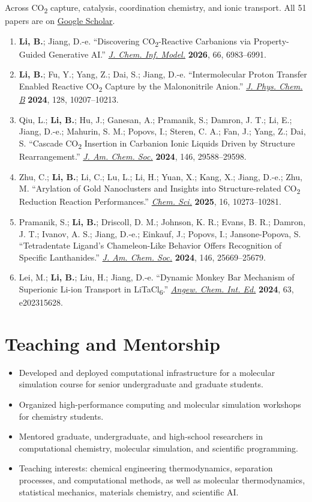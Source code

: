 \documentclass[10pt]{article}
\newcommand{\doi}[2]{\href{https://doi.org/#1}{\emph{#2}}}
\newcommand{\pub}[1]{\item #1}
\newcommand{\me}{\textbf{Li, B.}}
\newcommand{\co}{CO\textsubscript{2}}
\begin{document}
{\color{muted}Across \co{} capture, catalysis, coordination chemistry, and ionic transport. All 51
papers are on \href{https://scholar.google.com/citations?user=g8bfBFUAAAAJ}{Google Scholar}.}
\begin{enumerate}[leftmargin=1.6em, topsep=3pt, itemsep=2pt, parsep=0pt]
  \pub{\me; Jiang, D.-e. ``Discovering \co-Reactive Carbanions via Property-Guided Generative
    AI.'' \doi{10.1021/acs.jcim.6c00680}{J. Chem. Inf. Model.} \textbf{2026}, 66, 6983--6991.}
  \pub{\me; Fu, Y.; Yang, Z.; Dai, S.; Jiang, D.-e. ``Intermolecular Proton Transfer Enabled
    Reactive \co{} Capture by the Malononitrile Anion.'' \doi{10.1021/acs.jpcb.4c04482}{J. Phys. Chem. B} \textbf{2024},
    128, 10207--10213.}
  \pub{Qiu, L.; \me; Hu, J.; Ganesan, A.; Pramanik, S.; Damron, J. T.; Li, E.; Jiang, D.-e.;
    Mahurin, S. M.; Popovs, I.; Steren, C. A.; Fan, J.; Yang, Z.; Dai, S. ``Cascade \co{}
    Insertion in Carbanion Ionic Liquids Driven by Structure Rearrangement.'' \doi{10.1021/jacs.4c09933}{J. Am. Chem.
    Soc.} \textbf{2024}, 146, 29588--29598.}
  \pub{Zhu, C.; \me; Li, C.; Lu, L.; Li, H.; Yuan, X.; Kang, X.; Jiang, D.-e.; Zhu, M.
    ``Arylation of Gold Nanoclusters and Insights into Structure-related \co{} Reduction Reaction
    Performances.'' \doi{10.1039/d5sc01200g}{Chem. Sci.} \textbf{2025}, 16, 10273--10281.}
  \pub{Pramanik, S.; \me; Driscoll, D. M.; Johnson, K. R.; Evans, B. R.; Damron, J. T.; Ivanov,
    A. S.; Jiang, D.-e.; Einkauf, J.; Popovs, I.; Jansone-Popova, S. ``Tetradentate Ligand's
    Chameleon-Like Behavior Offers Recognition of Specific Lanthanides.'' \doi{10.1021/jacs.4c07332}{J. Am. Chem. Soc.}
    \textbf{2024}, 146, 25669--25679.}
  \pub{Lei, M.; \me; Liu, H.; Jiang, D.-e. ``Dynamic Monkey Bar Mechanism of Superionic Li-ion
    Transport in LiTaCl\textsubscript{6}.'' \doi{10.1002/anie.202315628}{Angew. Chem. Int. Ed.} \textbf{2024}, 63,
    e202315628.}
\end{enumerate}

\section{Teaching and Mentorship}

\begin{itemize}
  \item Developed and deployed computational infrastructure for a molecular simulation course for
    senior undergraduate and graduate students.
  \item Organized high-performance computing and molecular simulation workshops for chemistry
    students.
  \item Mentored graduate, undergraduate, and high-school researchers in computational chemistry,
    molecular simulation, and scientific programming.
  \item Teaching interests: chemical engineering thermodynamics, separation processes, and
    computational methods, as well as molecular thermodynamics, statistical mechanics, materials
    chemistry, and scientific AI.
\end{itemize}
\end{document}
